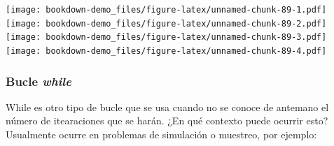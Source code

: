\documentclass[]{book}
\newenvironment{Shaded}{\begin{snugshade}}{\end{snugshade}}
\newcommand{\KeywordTok}[1]{\textcolor[rgb]{0.13,0.29,0.53}{\textbf{#1}}}
\newcommand{\DataTypeTok}[1]{\textcolor[rgb]{0.13,0.29,0.53}{#1}}
\newcommand{\DecValTok}[1]{\textcolor[rgb]{0.00,0.00,0.81}{#1}}
\newcommand{\StringTok}[1]{\textcolor[rgb]{0.31,0.60,0.02}{#1}}
\newcommand{\CommentTok}[1]{\textcolor[rgb]{0.56,0.35,0.01}{\textit{#1}}}
\newcommand{\ControlFlowTok}[1]{\textcolor[rgb]{0.13,0.29,0.53}{\textbf{#1}}}
\newcommand{\OperatorTok}[1]{\textcolor[rgb]{0.81,0.36,0.00}{\textbf{#1}}}
\newcommand{\NormalTok}[1]{#1}
\theoremstyle{definition}
\theoremstyle{definition}
\theoremstyle{definition}
\theoremstyle{remark}
\begin{document}
\begin{Shaded}
\end{Shaded}

\texttt{[image: bookdown-demo\_files/figure-latex/unnamed-chunk-89-1.pdf]}
\texttt{[image: bookdown-demo\_files/figure-latex/unnamed-chunk-89-2.pdf]}
\texttt{[image: bookdown-demo\_files/figure-latex/unnamed-chunk-89-3.pdf]}
\texttt{[image: bookdown-demo\_files/figure-latex/unnamed-chunk-89-4.pdf]}

\subsubsection{\texorpdfstring{Bucle
\emph{while}}{Bucle while}}\label{bucle-while}

While es otro tipo de bucle que se usa cuando no se conoce de antemano
el número de itearaciones que se harán. ¿En qué contexto puede ocurrir
esto? Usualmente ocurre en problemas de simulación o muestreo, por
ejemplo:
\end{document}
